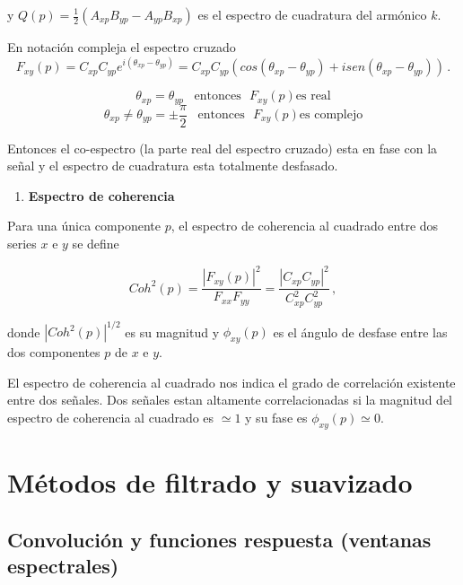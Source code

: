 \documentclass[
]{agujournal2019}
\providecommand{\tightlist}{%
  \setlength{\itemsep}{0pt}\setlength{\parskip}{0pt}}\usepackage{longtable,booktabs,array}
\begin{document}
y \(Q(p)=\frac{1}{2}(A_{xp}B_{yp} - A_{yp}B_{xp})\) es el espectro de
cuadratura del armónico \(k\).

En notación compleja el espectro cruzado
\[F_{xy}(p)=C_{xp}C_{yp}e^{i(\theta_{xp}-\theta_{yp})}=C_{xp}C_{yp}\left(cos(\theta_{xp}-\theta_{yp})+ isen(\theta_{xp}-\theta_{yp}) \right)\,.\]

\[\theta_{xp}=\theta_{yp}\,\,\,\,\,\text{entonces}\,\,\,\,F_{xy}(p) \text{es real}\]
\[\theta_{xp}\ne\theta_{yp}=\pm\frac{\pi}{2}\,\,\,\,\,\text{entonces}\,\,\,\,F_{xy}(p) \text{es complejo}\]

Entonces el co-espectro (la parte real del espectro cruzado) esta en
fase con la señal y el espectro de cuadratura esta totalmente desfasado.

\vspace{0.5cm}

\begin{enumerate}
\def\labelenumi{(\arabic{enumi})}
\setcounter{enumi}{4}
\tightlist
\item
  \textbf{Espectro de coherencia}
\end{enumerate}

Para una única componente \(p\), el espectro de coherencia al cuadrado
entre dos series \(x\) e \(y\) se define

\[Coh^2(p)=\frac{|F_{xy}(p)|^2}{F_{xx}F_{yy}}=\frac{|C_{xp}C_{yp}|^2}{C_{xp}^2C_{yp}^2}\,,\]

donde \(|Coh^2(p)|^{1/2}\) es su magnitud y \(\phi_{xy}(p)\) es el
ángulo de desfase entre las dos componentes \(p\) de \(x\) e \(y\).

El espectro de coherencia al cuadrado nos indica el grado de correlación
existente entre dos señales. Dos señales estan altamente correlacionadas
si la magnitud del espectro de coherencia al cuadrado es \(\simeq 1\) y
su fase es \(\phi_{xy}(p)\simeq 0\).

\hypertarget{muxe9todos-de-filtrado-y-suavizado}{%
\section{Métodos de filtrado y
suavizado}\label{muxe9todos-de-filtrado-y-suavizado}}

\hypertarget{convoluciuxf3n-y-funciones-respuesta-ventanas-espectrales}{%
\subsection{Convolución y funciones respuesta (ventanas
espectrales)}\label{convoluciuxf3n-y-funciones-respuesta-ventanas-espectrales}}
\end{document}
